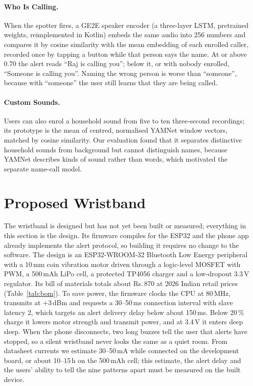 \documentclass{svproc}
\newcommand{\INR}{Rs.\,}
\begin{document}
\paragraph{Who Is Calling.} When the spotter fires, a GE2E speaker encoder \cite{wan2018} (a three-layer LSTM, pretrained weights, reimplemented in Kotlin) embeds the same audio into 256 numbers and compares it by cosine similarity with the mean embedding of each enrolled caller, recorded once by tapping a button while that person says the name. At or above 0.70 the alert reads ``Raj is calling you''; below it, or with nobody enrolled, ``Someone is calling you''. Naming the wrong person is worse than ``someone'', because with ``someone'' the user still learns that they are being called.

\paragraph{Custom Sounds.} Users can also enrol a household sound from five to ten three-second recordings; its prototype is the mean of centred, normalised YAMNet window vectors, matched by cosine similarity. Our evaluation found that it separates distinctive household sounds from background but cannot distinguish names, because YAMNet describes kinds of sound rather than words, which motivated the separate name-call model.

\section{Proposed Wristband}\label{sec:band}
The wristband is designed but has not yet been built or measured; everything in this section is the design. Its firmware compiles for the ESP32 and the phone app already implements the alert protocol, so building it requires no change to the software. The design is an ESP32-WROOM-32 Bluetooth Low Energy peripheral with a 10\,mm coin vibration motor driven through a logic-level MOSFET with PWM, a 500\,mAh LiPo cell, a protected TP4056 charger and a low-dropout 3.3\,V regulator. Its bill of materials totals about \INR 870 at 2026 Indian retail prices (Table~\ref{tab:bom}). To save power, the firmware clocks the CPU at 80\,MHz, transmits at $+3$\,dBm and requests a 30--50\,ms connection interval with slave latency 2, which targets an alert delivery delay below about 150\,ms. Below 20\,\% charge it lowers motor strength and transmit power, and at 3.4\,V it enters deep sleep. When the phone disconnects, two long buzzes tell the user that alerts have stopped, so a silent wristband never looks the same as a quiet room. From datasheet currents we estimate 30--50\,mA while connected on the development board, or about 10--15\,h on the 500\,mAh cell; this estimate, the alert delay and the users' ability to tell the nine patterns apart must be measured on the built device.
\end{document}
